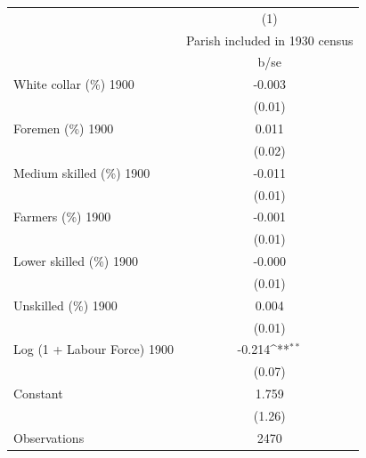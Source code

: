 {
\def\sym#1{\ifmmode^{#1}\else\(^{#1}\)\fi}
\begin{tabular}{l*{1}{c}}
\hline\hline
                    &\multicolumn{1}{c}{(1)}\\
                    &\multicolumn{1}{c}{Parish included in 1930 census}\\
                    &        b/se         \\
\hline
White collar (\%) 1900&      -0.003         \\
                    &      (0.01)         \\
Foremen (\%) 1900   &       0.011         \\
                    &      (0.02)         \\
Medium skilled (\%) 1900&      -0.011         \\
                    &      (0.01)         \\
Farmers (\%) 1900   &      -0.001         \\
                    &      (0.01)         \\
Lower skilled (\%) 1900&      -0.000         \\
                    &      (0.01)         \\
Unskilled (\%) 1900 &       0.004         \\
                    &      (0.01)         \\
Log (1 + Labour Force) 1900&      -0.214\sym{**} \\
                    &      (0.07)         \\
Constant            &       1.759         \\
                    &      (1.26)         \\
\hline
Observations        &        2470         \\
\hline\hline
\end{tabular}
}
